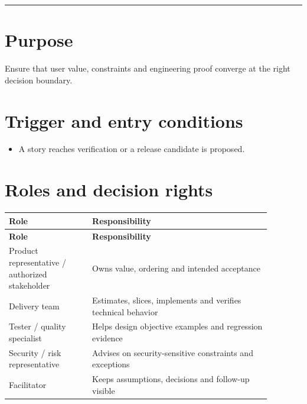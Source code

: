 \documentclass[11pt,letterpaper]{article}
\begin{document}
\tableofcontents\medskip\noindent\rule{\linewidth}{0.4pt}\medskip
\section{Purpose}
Ensure that user value, constraints and engineering proof converge at the right decision boundary.

\section{Trigger and entry conditions}
\begin{itemize}[leftmargin=*,itemsep=2pt]
\item A story reaches verification or a release candidate is proposed.
\end{itemize}
\section{Roles and decision rights}
\begin{longtable}{|p{0.28\linewidth}|p{0.60\linewidth}|}\hline
\textbf{Role} & \textbf{Responsibility} \\ \hline\endfirsthead\hline
\textbf{Role} & \textbf{Responsibility} \\ \hline\endhead
Product representative / authorized stakeholder & Owns value, ordering and intended acceptance \\ \hline
Delivery team & Estimates, slices, implements and verifies technical behavior \\ \hline
Tester / quality specialist & Helps design objective examples and regression evidence \\ \hline
Security / risk representative & Advises on security-sensitive constraints and exceptions \\ \hline
Facilitator & Keeps assumptions, decisions and follow-up visible \\ \hline
\end{longtable}
\end{document}
